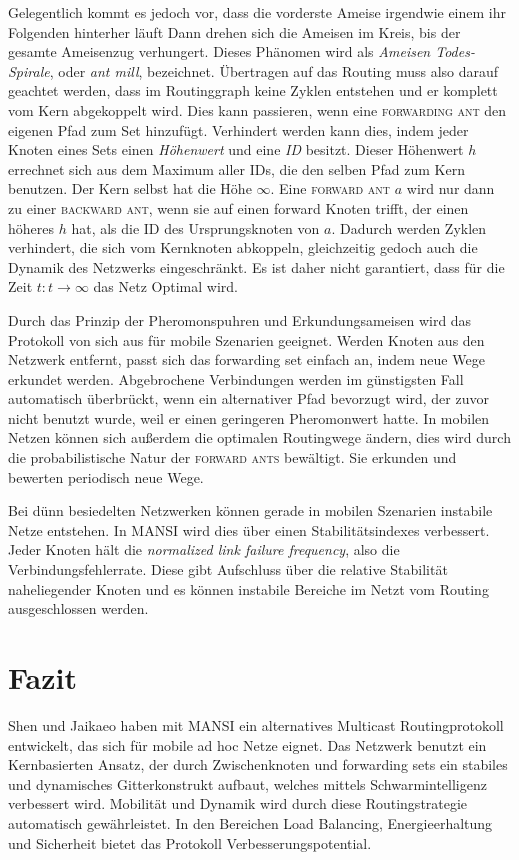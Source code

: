Gelegentlich kommt es jedoch vor, dass die vorderste Ameise irgendwie einem ihr Folgenden hinterher läuft
Dann drehen sich die Ameisen im Kreis, bis der gesamte Ameisenzug verhungert.
Dieses Phänomen wird als \emph{Ameisen Todes-Spirale}, oder \emph{ant mill}, bezeichnet.
Übertragen auf das Routing muss also darauf geachtet werden, dass im Routinggraph keine Zyklen entstehen und er komplett vom Kern abgekoppelt wird.
Dies kann passieren, wenn eine \textsc{forwarding ant} den eigenen Pfad zum Set hinzufügt.
Verhindert werden kann dies, indem jeder Knoten eines Sets einen \emph{Höhenwert} und eine \emph{ID} besitzt.
Dieser Höhenwert $h$ errechnet sich aus dem Maximum aller IDs, die den selben Pfad zum Kern benutzen.
Der Kern selbst hat die Höhe $\infty$.
Eine \textsc{forward ant} $a$ wird nur dann zu einer \textsc{backward ant}, wenn sie auf einen forward Knoten trifft, der einen höheres $h$ 
hat, als die ID des Ursprungsknoten von $a$.
Dadurch werden Zyklen verhindert, die sich vom Kernknoten abkoppeln, gleichzeitig gedoch auch die Dynamik des Netzwerks eingeschränkt.
Es ist daher nicht garantiert, dass für die Zeit $t: t \rightarrow \infty$ das Netz Optimal wird.

Durch das Prinzip der Pheromonspuhren und Erkundungsameisen wird das Protokoll von sich aus für mobile Szenarien geeignet.
Werden Knoten aus den Netzwerk entfernt, passt sich das forwarding set einfach an, indem neue Wege erkundet werden.
Abgebrochene Verbindungen werden im günstigsten Fall automatisch überbrückt, wenn ein alternativer Pfad bevorzugt wird, der zuvor nicht benutzt wurde, 
weil er einen geringeren Pheromonwert hatte. 
In mobilen Netzen können sich außerdem die optimalen Routingwege ändern, dies wird durch die probabilistische Natur der \textsc{forward ants} bewältigt.
Sie erkunden und bewerten periodisch neue Wege.

Bei dünn besiedelten Netzwerken können gerade in mobilen Szenarien instabile Netze entstehen.
In MANSI wird dies über einen Stabilitätsindexes verbessert.
Jeder Knoten hält die \emph{normalized link failure frequency},
also die Verbindungsfehlerrate.
Diese gibt Aufschluss über die relative Stabilität naheliegender Knoten und es können instabile Bereiche im Netzt vom Routing ausgeschlossen werden.

\section{Fazit}
Shen und Jaikaeo haben mit MANSI ein alternatives Multicast Routingprotokoll entwickelt, das sich für mobile ad hoc Netze eignet.
Das Netzwerk benutzt ein Kernbasierten Ansatz, der durch Zwischenknoten und forwarding sets ein stabiles und dynamisches Gitterkonstrukt aufbaut,
welches mittels Schwarmintelligenz verbessert wird.
Mobilität und Dynamik wird durch diese Routingstrategie automatisch gewährleistet.
In den Bereichen Load Balancing, Energieerhaltung und Sicherheit bietet das Protokoll Verbesserungspotential.

